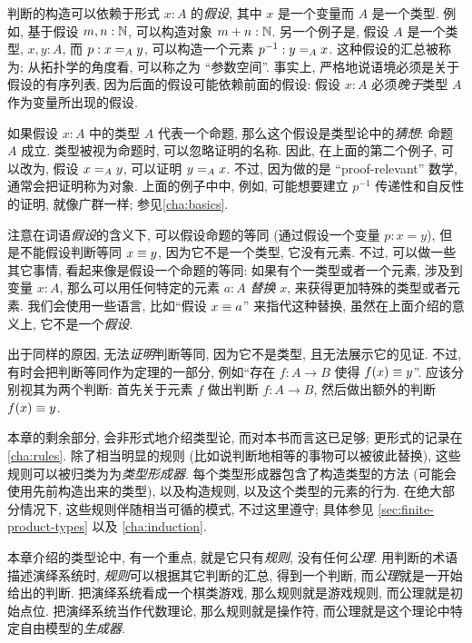 %
判断的构造可以依赖于形式 $x:A$ 的\emph{假设}, 其中 $x$ 是一个变量而 $A$ 是一个类型.
例如, 基于假设 $m,n : \nat$, 可以构造对象 $m + n : \nat$.
另一个例子是, 假设 $A$ 是一个类型, $x,y : A$, 而  $p : \id[A]{x}{y}$, 可以构造一个元素 $p^{-1} : \id[A]{y}{x}$.
这种假设的汇总被称为;
从拓扑学的角度看, 可以称之为 ``参数空间''.
事实上, 严格地说语境必须是关于假设的有序列表, 因为后面的假设可能依赖前面的假设: 假设 $x:A$ 必须\emph{晚于}类型 $A$ 作为变量所出现的假设.

如果假设 $x:A$ 中的类型 $A$ 代表一个命题, 那么这个假设是类型论中的\emph{猜想}:
%
命题 $A$ 成立.
类型被视为命题时, 可以忽略证明的名称.
因此, 在上面的第二个例子, 可以改为, 假设 $\id[A]{x}{y}$, 可以证明 $\id[A]{y}{x}$.
不过, 因为做的是 ``proof-relevant'' 数学,
%
通常会把证明称为对象.
上面的例子中中, 例如, 可能想要建立 $p^{-1}$ 传递性和自反性的证明, 就像广群一样;
参见\cref{cha:basics}.

注意在词语\emph{假设}的含义下, 可以假设命题的等同 (通过假设一个变量 $p:x=y$), 但是不能假设判断等同 $x\jdeq y$, 因为它不是一个类型, 它没有元素.
不过, 可以做一些其它事情, 看起来像是假设一个命题的等同: 如果有个一类型或者一个元素, 涉及到变量 $x:A$, 那么可以用任何特定的元素 $a:A$ \emph{替换} $x$, 来获得更加特殊的类型或者元素.
我们会使用一些语言, 比如``假设 $x\jdeq a$'' 来指代这种替换, 虽然在上面介绍的意义上, 它不是一个\emph{假设}.
%
%

出于同样的原因, 无法\emph{证明}判断等同, 因为它不是类型, 且无法展示它的见证.
不过, 有时会把判断等同作为定理的一部分, 例如``存在 $f:A\to B$ 使得 $f(x)\jdeq y$''.
应该分别视其为两个判断: 首先关于元素 $f$ 做出判断  $f:A\to B$, 然后做出额外的判断 $f(x)\jdeq y$.

本章的剩余部分, 会非形式地介绍类型论, 而对本书而言这已足够;
更形式的记录在\cref{cha:rules}.
除了相当明显的规则 (比如说判断地相等的事物可以被彼此替换), 这些规则可以被归类为为\emph{类型形成器}.
每个类型形成器包含了构造类型的方法 (可能会使用先前构造出来的类型), 以及构造规则, 以及这个类型的元素的行为.
在绝大部分情况下, 这些规则伴随相当可循的模式, 不过这里遵守;
具体参见 \cref{sec:finite-product-types} 以及 \cref{cha:induction}.
%

%
%
本章介绍的类型论中, 有一个重点, 就是它只有\emph{规则}, 没有任何\emph{公理}.
用判断的术语描述演绎系统时, \emph{规则}可以根据其它判断的汇总, 得到一个判断, 而\emph{公理}就是一开始给出的判断.
把演绎系统看成一个棋类游戏, 那么规则就是游戏规则, 而公理就是初始点位.
把演绎系统当作代数理论, 那么规则就是操作符, 而公理就是这个理论中特定自由模型的\emph{生成器}.

